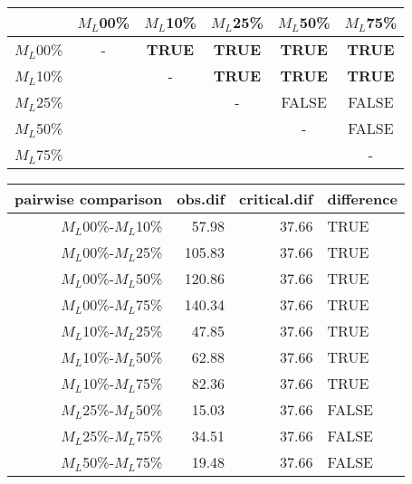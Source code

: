 \begin{tabular}{c|ccccc}
    \hline
              & $M_L$00\% & $M_L$10\% & $M_L$25\% & $M_L$50\% & $M_L$75\% \\
    \hline
    $M_L$00\% & - & \textbf{TRUE}  & \textbf{TRUE} & \textbf{TRUE} & \textbf{TRUE}\\
    $M_L$10\% & & - & \textbf{TRUE}  & \textbf{TRUE} & \textbf{TRUE} \\
    $M_L$25\% & & & - & FALSE  & FALSE \\
    $M_L$50\% & & & & - & FALSE  \\
    $M_L$75\% & & & & & - \\
    \hline
\end{tabular}
\centering
\begin{tabular}{rrrl}
 pairwise comparison & obs.dif & critical.dif & difference \\ 
  \hline
  $M_L$00\%-$M_L$10\% & 57.98 & 37.66 & TRUE \\ 
  $M_L$00\%-$M_L$25\% & 105.83 & 37.66 & TRUE \\ 
  $M_L$00\%-$M_L$50\% & 120.86 & 37.66 & TRUE \\ 
  $M_L$00\%-$M_L$75\% & 140.34 & 37.66 & TRUE \\ 
  $M_L$10\%-$M_L$25\% & 47.85 & 37.66 & TRUE \\ 
  $M_L$10\%-$M_L$50\% & 62.88 & 37.66 & TRUE \\ 
  $M_L$10\%-$M_L$75\% & 82.36 & 37.66 & TRUE \\ 
  $M_L$25\%-$M_L$50\% & 15.03 & 37.66 & FALSE \\ 
  $M_L$25\%-$M_L$75\% & 34.51 & 37.66 & FALSE \\ 
  $M_L$50\%-$M_L$75\% & 19.48 & 37.66 & FALSE \\ 
   \hline
\end{tabular}